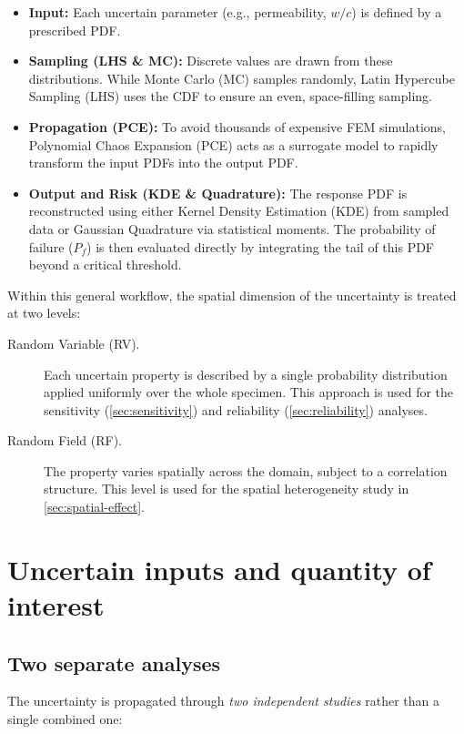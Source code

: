 \begin{itemize}
    \item \textbf{Input:} Each uncertain parameter (e.g., permeability, $w/c$) is defined by a prescribed PDF.
    \item \textbf{Sampling (LHS \& MC):} Discrete values are drawn from these distributions. While Monte Carlo (MC) samples randomly, Latin Hypercube Sampling (LHS) uses the CDF to ensure an even, space-filling sampling.
    \item \textbf{Propagation (PCE):} To avoid thousands of expensive FEM simulations, Polynomial Chaos Expansion (PCE) acts as a surrogate model to rapidly transform the input PDFs into the output PDF.
    \item \textbf{Output and Risk (KDE \& Quadrature):} The response PDF is reconstructed using either Kernel Density Estimation (KDE) from sampled data or Gaussian Quadrature via statistical moments. The probability of failure ($P_f$) is then evaluated directly by integrating the tail of this PDF beyond a critical threshold.
\end{itemize}

Within this general workflow, the spatial dimension of the uncertainty is treated at two levels:
\begin{description}
    \item[Random Variable (RV).] Each uncertain property is described by a single probability distribution applied uniformly over the whole specimen. This approach is used for the sensitivity (\cref{sec:sensitivity}) and reliability (\cref{sec:reliability}) analyses.
    \item[Random Field (RF).] The property varies spatially across the domain, subject to a correlation structure. This level is used for the spatial heterogeneity study in \cref{sec:spatial-effect}.
\end{description}


\section{Uncertain inputs and quantity of interest} \label{sec:uncertain-params}
 
\subsection{Two separate analyses} \label{sec:two-analyses}
 
The uncertainty is propagated through \emph{two independent studies} rather than a single combined one:
 
